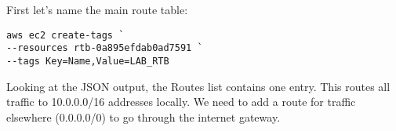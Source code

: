 \begin{Shaded}
\begin{Highlighting}[]
\FunctionTok{\{}
    \FunctionTok{:} \OtherTok{[}
        \FunctionTok{\{}
            \FunctionTok{:} \OtherTok{[}
                \FunctionTok{\{}
                    \FunctionTok{:} \FunctionTok{,}
                    \FunctionTok{:} \FunctionTok{,}
                    \FunctionTok{:} \FunctionTok{,}
                    \FunctionTok{:} \FunctionTok{\{}
                        \FunctionTok{:} 
                    \FunctionTok{\}}
                \FunctionTok{\}}
            \OtherTok{]}\FunctionTok{,}
            \FunctionTok{:} \OtherTok{[]}\FunctionTok{,}
            \FunctionTok{:} \FunctionTok{,}
            \FunctionTok{:} \OtherTok{[}
                \FunctionTok{\{}
                    \FunctionTok{:} \FunctionTok{,}
                    \FunctionTok{:} \FunctionTok{,}
                    \FunctionTok{:} \FunctionTok{,}
                    \FunctionTok{:} 
                \FunctionTok{\}}
            \OtherTok{]}\FunctionTok{,}
            \FunctionTok{:} \OtherTok{[]}\FunctionTok{,}
            \FunctionTok{:} \FunctionTok{,}
            \FunctionTok{:} 
        \FunctionTok{\}}
    \OtherTok{]}
\FunctionTok{\}}
\end{Highlighting}
\end{Shaded}

First let's name the main route table:

\begin{verbatim}
aws ec2 create-tags `
--resources rtb-0a895efdab0ad7591 `
--tags Key=Name,Value=LAB_RTB
\end{verbatim}

Looking at the JSON output, the Routes list contains one entry. This
routes all traffic to 10.0.0.0/16 addresses locally. We need to add a
route for traffic elsewhere (0.0.0.0/0) to go through the internet
gateway.

